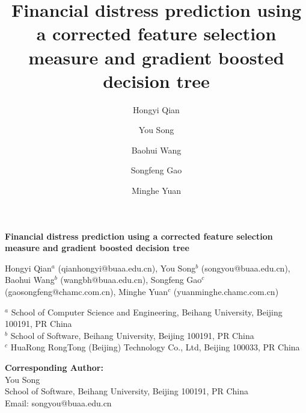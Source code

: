 \documentclass[review]{elsarticle}
\begin{document}
\begin{frontmatter}


\begin{titlepage}
\begin{center}
\vspace*{1cm}

\textbf{ \large Financial distress prediction using a corrected feature selection measure and gradient boosted decision tree}

\vspace{1.5cm}

Hongyi Qian$^{a}$ (qianhongyi@buaa.edu.cn), You Song$^b$ (songyou@buaa.edu.cn), Baohui Wang$^b$ (wangbh@buaa.edu.cn), Songfeng Gao$^c$ (gaosongfeng@chamc.com.cn), Minghe Yuan$^c$ (yuanminghe.chamc.com.cn) \\

\hspace{10pt}

\begin{flushleft}
\small
$^a$ School of Computer Science and Engineering, Beihang University, Beijing 100191, PR China \\
$^b$ School of Software, Beihang University, Beijing 100191, PR China \\
$^c$ HuaRong RongTong (Beijing) Technology Co., Ltd, Beijing 100033, PR China

\vspace{1cm}
\textbf{Corresponding Author:} \\
You Song \\
School of Software, Beihang University, Beijing 100191, PR China \\
Email: songyou@buaa.edu.cn


\end{flushleft}
\end{center}
\end{titlepage}

\title{Financial distress prediction using a corrected feature selection measure and gradient boosted decision tree}

\author[label1]{Hongyi Qian}

\author[label2]{You Song }

\author[label2]{Baohui Wang}

\author[label3]{Songfeng Gao}

\author[label3]{Minghe Yuan}


\end{frontmatter}
\end{document}
